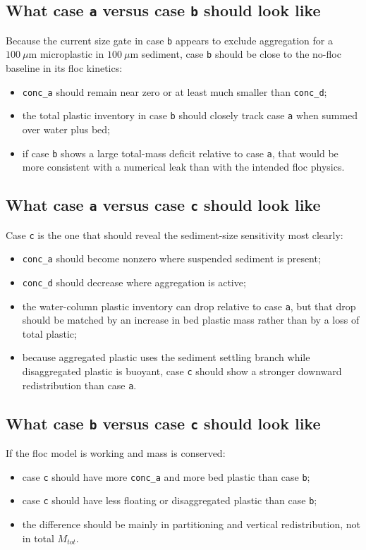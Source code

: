 \documentclass[11pt]{article}
\begin{document}
\subsection{What case \texttt{a} versus case \texttt{b} should look like}
Because the current size gate in case \texttt{b} appears to exclude aggregation for a
\(100\ \mu\mathrm{m}\) microplastic in \(100\ \mu\mathrm{m}\) sediment, case \texttt{b} should be close to
the no-floc baseline in its floc kinetics:
\begin{itemize}
\item \texttt{conc\_a} should remain near zero or at least much smaller than \texttt{conc\_d};
\item the total plastic inventory in case \texttt{b} should closely track case \texttt{a} when summed over
water plus bed;
\item if case \texttt{b} shows a large total-mass deficit relative to case \texttt{a}, that would be more
consistent with a numerical leak than with the intended floc physics.
\end{itemize}

\subsection{What case \texttt{a} versus case \texttt{c} should look like}
Case \texttt{c} is the one that should reveal the sediment-size sensitivity most clearly:
\begin{itemize}
\item \texttt{conc\_a} should become nonzero where suspended sediment is present;
\item \texttt{conc\_d} should decrease where aggregation is active;
\item the water-column plastic inventory can drop relative to case \texttt{a}, but that drop should be
matched by an increase in bed plastic mass rather than by a loss of total plastic;
\item because aggregated plastic uses the sediment settling branch while disaggregated plastic is buoyant,
case \texttt{c} should show a stronger downward redistribution than case \texttt{a}.
\end{itemize}

\subsection{What case \texttt{b} versus case \texttt{c} should look like}
If the floc model is working and mass is conserved:
\begin{itemize}
\item case \texttt{c} should have more \texttt{conc\_a} and more bed plastic than case \texttt{b};
\item case \texttt{c} should have less floating or disaggregated plastic than case \texttt{b};
\item the difference should be mainly in partitioning and vertical redistribution, not in total
\(M_{tot}\).
\end{itemize}
\end{document}
